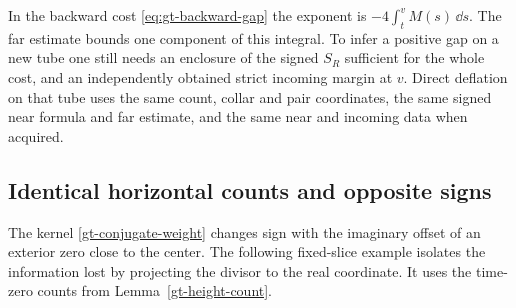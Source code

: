 In the backward cost \eqref{eq:gt-backward-gap} the exponent is
\(-4\int_t^v M(s)\,\dd s\). The far estimate bounds one component
of this integral. To infer a positive gap on a new tube one still
needs an enclosure of the signed \(S_R\) sufficient for the whole
cost, and an independently obtained strict incoming margin at \(v\).
Direct deflation on that tube uses the same count, collar and
pair coordinates, the same signed near formula and far estimate,
and the same near and incoming data when acquired.

\subsection{Identical horizontal counts and opposite signs}

The kernel \eqref{gt-conjugate-weight} changes sign with the
imaginary offset of an exterior zero close to the center.
The following fixed-slice example isolates the information lost
by projecting the divisor to the real coordinate. It uses the
time-zero counts from Lemma~\ref{gt-height-count}.

